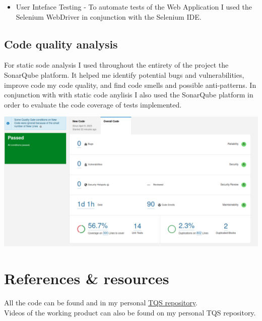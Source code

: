 \documentclass[12pt]{article}
\begin{document}
\begin{itemize}
\item User Inteface Testing - To automate tests of the Web Application I used the Selenium WebDriver in conjunction with the Selenium IDE. 
\end{itemize}

\subsection{Code quality analysis}

For static sode analysis I used throughout the entirety of the project the SonarQube platform. It helped me identify potential bugs and vulnerabilities, improve code my code quality, and find code smells and possible anti-patterns. In conjunction with with static code anylisis I also used the SonarQube platform in order to evaluate the code coverage of tests implemented.

\includegraphics[scale=0.35]{sonarQube.png}


\section{References \& resources}

All the code can be found and in my personal \href{https://github.com/Rafael-Remigio/TQS_102435/tree/main/HW1}{TQS repository}.\\
Videos of the working product can also be found on my personal TQS repository.
\end{document}
